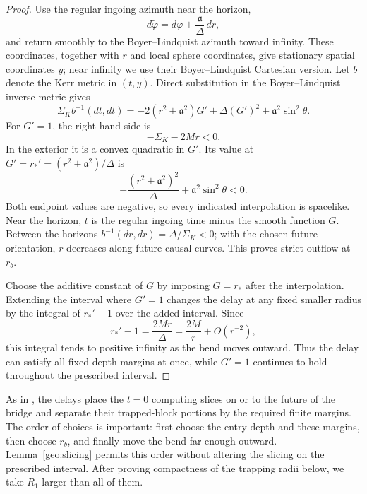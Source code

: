 \begin{proof}
Use the regular ingoing azimuth near the horizon,
\[
 d\widetilde\varphi=d\varphi+\frac{\mathfrak a}{\Delta}\,dr,
\]
and return smoothly to the Boyer--Lindquist azimuth toward infinity.  These
coordinates, together with $r$ and local sphere coordinates, give
stationary spatial coordinates $y$; near infinity we use their
Boyer--Lindquist Cartesian version.  Let $b$ denote the Kerr metric in
$(t,y)$.  Direct substitution in the Boyer--Lindquist inverse metric gives
\begin{equation}
 \Sigma_K b^{-1}(dt,dt)
 =-2(r^2+\mathfrak a^2)G'+\Delta(G')^2
      +\mathfrak a^2\sin^2\theta.
 \label{geo:time-norm}
\end{equation}
For $G'=1$, the right-hand side is
\begin{equation}
 -\Sigma_K-2Mr<0.
 \label{geo:time-norm-one}
\end{equation}
In the exterior it is a convex quadratic in $G'$.  Its value at
$G'=r_*'=(r^2+\mathfrak a^2)/\Delta$ is
\[
 -\frac{(r^2+\mathfrak a^2)^2}{\Delta}
       +\mathfrak a^2\sin^2\theta<0.
\]
Both endpoint values are negative, so every indicated interpolation is
spacelike.  Near the horizon, $t$ is the regular ingoing time minus the
smooth function $G$.  Between the horizons $b^{-1}(dr,dr)=\Delta/\Sigma_K<0$;
with the chosen future orientation, $r$ decreases along future causal
curves.  This proves strict outflow at $r_b$.

Choose the additive constant of $G$ by imposing $G=r_*$ after the
interpolation.  Extending the interval where $G'=1$ changes the delay at
any fixed smaller radius by the integral of $r_*'-1$ over the added
interval.  Since
\[
 r_*'-1=\frac{2Mr}{\Delta}=\frac{2M}{r}+O(r^{-2}),
\]
this integral tends to positive infinity as the bend moves outward.  Thus
the delay can satisfy all fixed-depth margins at once, while $G'=1$
continues to hold throughout the prescribed interval.
\end{proof}

As in , the delays place the $t=0$ computing slices on
or to the future of the bridge and separate their trapped-block portions
by the required finite margins.  The order of choices is important:
first choose the entry depth and these margins, then choose $r_b$, and
finally move the bend far enough outward.  Lemma~\ref{geo:slicing} permits
this order without altering the slicing on the prescribed interval.
After proving compactness of the trapping radii below, we take $R_1$
larger than all of them.

